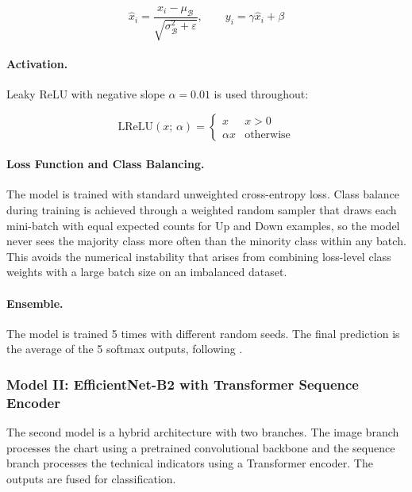 \begin{equation}
\hat{x}_i = \frac{x_i - \mu_{\mathcal{B}}}{\sqrt{\sigma^2_{\mathcal{B}} + \varepsilon}}, \qquad y_i = \gamma \hat{x}_i + \beta
\label{eq:batchnorm}
\end{equation}

\paragraph{Activation.}
Leaky ReLU with negative slope $\alpha = 0.01$ is used throughout:

\begin{equation}
\text{LReLU}(x;\, \alpha) = \begin{cases} x & x > 0 \\ \alpha x & \text{otherwise} \end{cases}
\label{eq:lrelu}
\end{equation}

\paragraph{Loss Function and Class Balancing.}
The model is trained with standard unweighted cross-entropy loss. Class balance during training is achieved through a weighted random sampler that draws each mini-batch with equal expected counts for Up and Down examples, so the model never sees the majority class more often than the minority class within any batch. This avoids the numerical instability that arises from combining loss-level class weights with a large batch size on an imbalanced dataset.

\paragraph{Ensemble.}
The model is trained 5 times with different random seeds. The final prediction is the average of the 5 softmax outputs, following \textcite{Jiang2023}.

\subsubsection{Model II: EfficientNet-B2 with Transformer Sequence Encoder}
\label{sec:model2}

The second model is a hybrid architecture with two branches. The image branch processes the chart using a pretrained convolutional backbone and the sequence branch processes the technical indicators using a Transformer encoder. The outputs are fused for classification.

